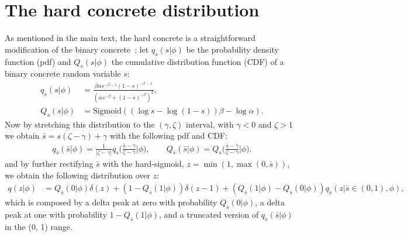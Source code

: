 \documentclass{article} %
\begin{document}
\section{The hard concrete distribution}
As mentioned in the main text, the hard concrete is a straightforward modification of the binary concrete~\citep{maddison2016concrete,jang2016categorical}; let $q_s(s|\phi)$ be the probability density function (pdf) and $Q_s(s|\phi)$ the cumulative distribution function (CDF) of a binary concrete random variable $s$:
\begin{align}
    q_s(s|\phi) & = \frac{\beta \alpha s^{-\beta - 1}(1 - s)^{-\beta - 1}}{(\alpha s^{-\beta} + (1 - s)^{-\beta})^2},\\
    Q_s(s|\phi) & = \text{Sigmoid}((\log s - \log (1 - s))\beta - \log\alpha).
\end{align}
Now by stretching this distribution to the $(\gamma, \zeta)$ interval, with $\gamma < 0$ and $\zeta > 1$ we obtain $\bar{s} = s(\zeta - \gamma) + \gamma$ with the following pdf and CDF:
\begin{align}
    q_{\bar{s}}(\bar{s}|\phi) = \frac{1}{|\zeta - \gamma|} q_s\bigg(\frac{\bar{s} - \gamma}{\zeta - \gamma}\bigg|\phi\bigg), \qquad
    Q_{\bar{s}}(\bar{s}|\phi) = Q_s\bigg(\frac{\bar{s} - \gamma}{\zeta - \gamma}\bigg|\phi\bigg).
\end{align}
and by further rectifying $\bar{s}$ with the hard-sigmoid, $z = \min(1, \max(0, \bar{s}))$, we obtain the following distribution over $z$:
\begin{align}
	q(z|\phi) & = Q_{\bar{s}}(0|\phi)\delta(z) +  (1 - Q_{\bar{s}}(1|\phi)) \delta(z - 1) + (Q_{\bar{s}}(1|\phi) - Q_{\bar{s}}(0|\phi))q_{\bar{s}}(z| \bar{s} \in (0, 1), \phi),
\end{align}
which is composed by a delta peak at zero with probability $Q_{\bar{s}}(0|\phi)$, a delta peak at one with probability $1 - Q_{\bar{s}}(1|\phi)$, and a truncated version of $q_{\bar{s}}(\bar{s}|\phi)$ in the (0, 1) range.
 
\end{document}
